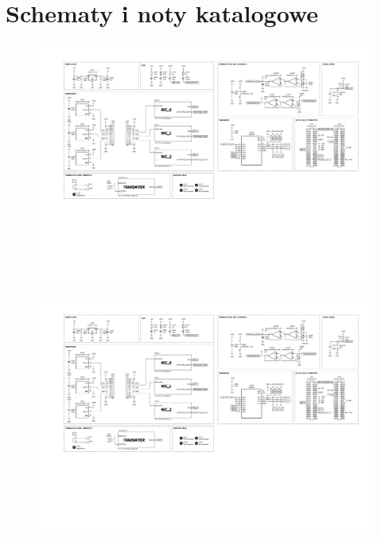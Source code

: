 \chapter{Schematy i noty katalogowe}

\begin{figure}
    \centering
    \includegraphics[angle = 90, height = \textheight, trim=2cm 10cm 2cm 2cm, clip]{./figures/chapter_09/schemat_plytki.pdf}
\end{figure}

\begin{figure}
    \includegraphics[page = 2, width = \textwidth, trim=2cm 10cm 2cm 6cm, clip]{./figures/chapter_09/schemat_plytki.pdf}
\end{figure}

